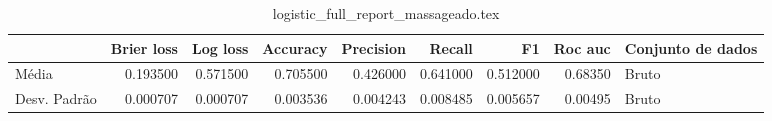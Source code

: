 \begin{table}
\centering
\caption{logistic_full_report_massageado.tex}
\label{logistic_full_report_massageado.tex}
\begin{tabular}{lrrrrrrrl}
\toprule
{} &  Brier  loss &  Log loss &  Accuracy  &  Precision  &   Recall  &       F1  &  Roc auc  & Conjunto de dados \\
\midrule
Média        &     0.193500 &  0.571500 &   0.705500 &    0.426000 &  0.641000 &  0.512000 &   0.68350 &             Bruto \\
Desv. Padrão &     0.000707 &  0.000707 &   0.003536 &    0.004243 &  0.008485 &  0.005657 &   0.00495 &             Bruto \\
\bottomrule
\end{tabular}
\end{table}
